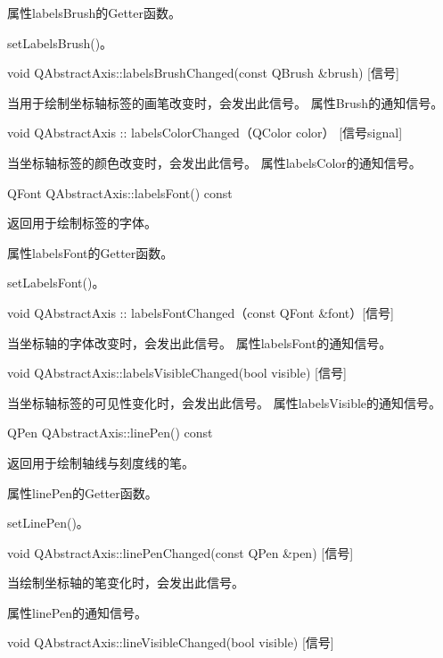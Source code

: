 \begin{notice}
属性labelsBrush的Getter函数。
\end{notice}

\begin{seeAlso}
setLabelsBrush()。
\end{seeAlso}


void QAbstractAxis::labelsBrushChanged(const QBrush \&brush) [信号] 

当用于绘制坐标轴标签的画笔改变时，会发出此信号。 属性Brush的通知信号。

void QAbstractAxis :: labelsColorChanged（QColor color） [信号signal] 

当坐标轴标签的颜色改变时，会发出此信号。 属性labelsColor的通知信号。

QFont QAbstractAxis::labelsFont() const 

返回用于绘制标签的字体。 

\begin{notice}
属性labelsFont的Getter函数。
\end{notice}

\begin{seeAlso}
setLabelsFont()。
\end{seeAlso}

void QAbstractAxis :: labelsFontChanged（const QFont \&font）[信号] 

当坐标轴的字体改变时，会发出此信号。 属性labelsFont的通知信号。

void QAbstractAxis::labelsVisibleChanged(bool visible) [信号] 

当坐标轴标签的可见性变化时，会发出此信号。 属性labelsVisible的通知信号。

QPen QAbstractAxis::linePen() const 

返回用于绘制轴线与刻度线的笔。 

\begin{notice}
属性linePen的Getter函数。
\end{notice}

\begin{seeAlso}
setLinePen()。
\end{seeAlso}

void QAbstractAxis::linePenChanged(const QPen \&pen) [信号] 

当绘制坐标轴的笔变化时，会发出此信号。 

\begin{notice}
属性linePen的通知信号。
\end{notice}

void QAbstractAxis::lineVisibleChanged(bool visible) [信号] 

